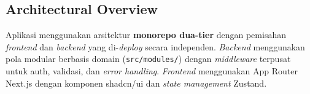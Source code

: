 
\subsection{Architectural Overview}

Aplikasi menggunakan arsitektur \textbf{monorepo dua-tier} dengan pemisahan
\textit{frontend} dan \textit{backend} yang di-\textit{deploy} secara independen.
\textit{Backend} menggunakan pola modular berbasis domain (\texttt{src/modules/})
dengan \textit{middleware} terpusat untuk auth, validasi, dan \textit{error
handling}. \textit{Frontend} menggunakan App Router Next.js dengan komponen
shadcn/ui dan \textit{state management} Zustand.

